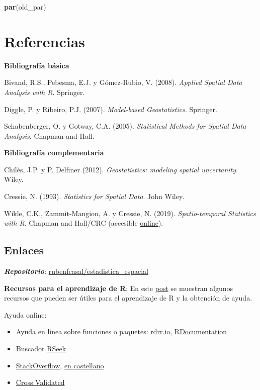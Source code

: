 \documentclass[
]{book}
\newenvironment{Shaded}{\begin{snugshade}}{\end{snugshade}}
\newcommand{\FunctionTok}[1]{\textcolor[rgb]{0.13,0.29,0.53}{\textbf{#1}}}
\newcommand{\NormalTok}[1]{#1}
\theoremstyle{break}
\theoremstyle{definition}
\theoremstyle{definition}
\theoremstyle{definition}
\theoremstyle{definition}
\theoremstyle{remark}
\begin{document}
\begin{Shaded}
\begin{Highlighting}[]
\FunctionTok{par}\NormalTok{(old\_par)}
\end{Highlighting}
\end{Shaded}

\chapter{Referencias}\label{referencias}

\textbf{Bibliografía básica}

Bivand, R.S., Pebesma, E.J. y Gómez-Rubio, V. (2008). \emph{Applied Spatial Data Analysis with R}. Springer.

Diggle, P. y Ribeiro, P.J. (2007). \emph{Model-based Geostatistics}. Springer.

Schabenberger, O. y Gotway, C.A. (2005). \emph{Statistical Methods for Spatial Data Analysis}. Chapman and Hall.

\textbf{Bibliografía complementaria}

Chilès, J.P. y P. Delfiner (2012). \emph{Geostatistics: modeling spatial uncertanity}. Wiley.

Cressie, N. (1993). \emph{Statistics for Spatial Data}. John Wiley.

Wikle, C.K., Zammit-Mangion, A. y Cressie, N. (2019). \emph{Spatio-temporal Statistics with R}. Chapman and Hall/CRC (accesible \href{https://spacetimewithr.org}{online}).

\section{Enlaces}\label{links}

\textbf{\emph{Repositorio}}: \href{https://github.com/rubenfcasal/estadistica_espacial}{rubenfcasal/estadistica\_espacial}

\textbf{Recursos para el aprendizaje de R}: En este \href{https://rubenfcasal.github.io/post/ayuda-y-recursos-para-el-aprendizaje-de-r}{post} se muestran algunos recursos que pueden ser útiles para el aprendizaje de R y la obtención de ayuda.

Ayuda online:

\begin{itemize}
\item
  Ayuda en línea sobre funciones o paquetes: \href{https://rdrr.io/}{rdrr.io}, \href{https://www.rdocumentation.org/}{RDocumentation}
\item
  Buscador \href{http://rseek.org/}{RSeek}
\item
  \href{http://stackoverflow.com/questions/tagged/r}{StackOverflow}, \href{https://es.stackoverflow.com/questions/tagged/r}{en castellano}
\item
  \href{https://stats.stackexchange.com}{Cross Validated}
\end{itemize}
\end{document}
